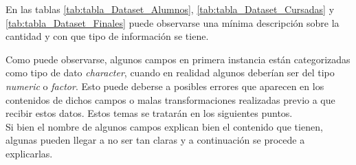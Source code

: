 

En las tablas \ref{tab:tabla_Dataset_Alumnos}, \ref{tab:tabla_Dataset_Cursadas} y \ref{tab:tabla_Dataset_Finales} puede observarse una mínima descripción sobre la cantidad y con que tipo de información se tiene. 

\vspace{3mm}







\vspace{3mm}

Como puede observarse, algunos campos en primera instancia están categorizadas como tipo de dato \textit{character}, cuando en realidad algunos deberían ser del tipo \textit{numeric} o \textit{factor}.
Esto puede deberse a posibles errores que aparecen en los contenidos de dichos campos o malas transformaciones realizadas previo a que recibir estos datos. Estos temas se tratarán en los siguientes puntos.
\\
Si bien el nombre de algunos campos explican bien el contenido que tienen, algunas pueden llegar a no ser tan claras y a continuación se procede a explicarlas.


